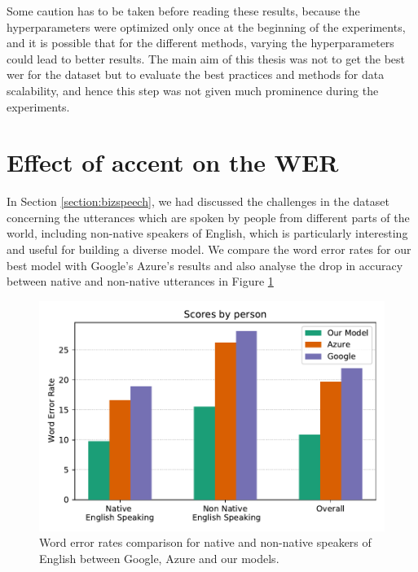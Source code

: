 Some caution has to be taken before reading these results, because the hyperparameters were optimized only once at the beginning of the experiments, and it is possible that for the different methods, varying the hyperparameters could lead to better results. The main aim of this thesis was not to get the best \acrshort{wer} for the dataset but to evaluate the best practices and methods for data scalability, and hence this step was not given much prominence during the experiments. 

\section{Effect of accent on the WER}
\label{section:accentwer}
In Section \ref{section:bizspeech}, we had discussed the challenges in the dataset concerning the utterances which are spoken by people from different parts of the world, including non-native speakers of English, which is particularly interesting and useful for building a diverse model. We compare the word error rates for our best model with Google's Azure's results and also analyse the drop in accuracy between native and non-native utterances in Figure \ref{fig:wer_cloud_final} 

\begin{figure}[ht]
  \begin{center}
    \includegraphics[width=\textwidth]{images/wer_cloud_final.pdf} 
    \caption{Word error rates comparison for native and non-native speakers of English between Google, Azure and our models.}
    \label{fig:wer_cloud_final}
  \end{center}
\end{figure}

